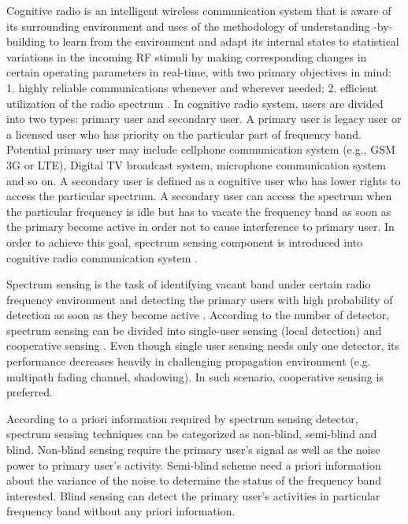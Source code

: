 \documentclass{report}
\begin{document}
\begin{spacing}{2.0}
Cognitive radio is an intelligent wireless communication system that is aware of its surrounding environment and uses of the methodology of understanding -by-building to learn from the environment and adapt its internal states to statistical variations in the incoming RF stimuli by making corresponding changes in certain operating parameters in real-time, with two primary objectives in mind: 1. highly reliable communications whenever and wherever needed; 2. efficient utilization of the radio spectrum \cite{a001}. In cognitive radio system, users are divided into two types: primary user and secondary user. A primary user is legacy user or a licensed user who has priority on the particular part of frequency band.  Potential primary user may include cellphone communication system (e.g., GSM 3G or LTE), Digital TV broadcast system, microphone communication system and so on. A secondary user is defined as a cognitive user who has lower rights to access the particular spectrum. A secondary user can access the spectrum when the particular frequency is idle but has to vacate the frequency band as soon as the primary become active in order not to cause interference to primary user. In order to achieve this goal, spectrum sensing component is introduced into cognitive radio communication system \cite{buddhikot2007understanding} \cite{tandra2009spectrum}.   

Spectrum sensing is the task of identifying vacant band under certain radio frequency environment and detecting the primary users with high probability of detection as soon as they become active \cite{umar2012spectrum}. According to the number of detector, spectrum sensing can be divided into single-user sensing (local detection) \cite{axell2010overview} \cite{wang2011advances} and cooperative sensing \cite{akyildiz2011cooperative}. Even though single user sensing needs only one detector, its performance decreases heavily in challenging propagation environment (e.g. multipath fading channel, shadowing). In such scenario, cooperative sensing is preferred.  

According to a priori information required by spectrum sensing detector, spectrum sensing techniques can be categorized as non-blind, semi-blind and blind. Non-blind sensing require the primary user's signal as well as the noise power to primary user's activity. Semi-blind scheme need a priori information about the variance of the noise to determine the status of the frequency band interested. Blind sensing can detect the primary user's activities in particular frequency band without any priori information. 


\end{spacing}
\end{document}
